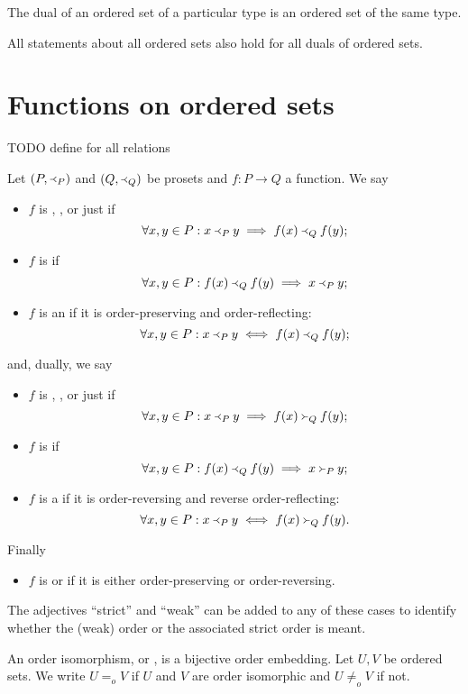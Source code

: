 \begin{lemma}
The dual of an ordered set of a particular type is an ordered set of the same type.
\end{lemma}
\begin{corollary}
All statements about all ordered sets also hold for all duals of ordered sets.
\end{corollary}

\section{Functions on ordered sets}
TODO define for all relations
\begin{definition}
Let $(P, \Yleft_P)$ and $(Q, \Yleft_Q)$ be prosets and $f: P\to Q$ a function. We say
\begin{itemize}
\item $f$ is , ,  or just  if
\[ \forall x,y\in P: x\Yleft_P y \implies f(x)\Yleft_Q f(y); \]
\item $f$ is  if
\[ \forall x,y\in P: f(x)\Yleft_Q f(y) \implies x\Yleft_P y; \]
\item $f$ is an  if it is order-preserving and order-reflecting:
\[ \forall x,y\in P: x\Yleft_P y \iff f(x)\Yleft_Q f(y); \]
\end{itemize}
and, dually, we say
\begin{itemize}
\item $f$ is , ,  or just  if
\[ \forall x,y\in P: x\Yleft_P y \implies f(x) \Yright_Q f(y); \]
\item $f$ is  if
\[ \forall x,y\in P: f(x)\Yleft_Q f(y) \implies x\Yright_P y; \]
\item $f$ is a  if it is order-reversing and reverse order-reflecting:
\[ \forall x,y\in P: x\Yleft_P y \iff f(x)\Yright_Q f(y). \]
\end{itemize}
Finally
\begin{itemize}
\item $f$ is  or  if it is either order-preserving or order-reversing.
\end{itemize}

The adjectives ``strict'' and ``weak'' can be added to any of these cases to identify whether the (weak) order or the associated strict order is meant.
\end{definition}
An order isomorphism, or , is a bijective order embedding. Let $U,V$ be ordered sets. We write $U =_o V$ if $U$ and $V$ are order isomorphic and $U \neq_o V$ if not.

